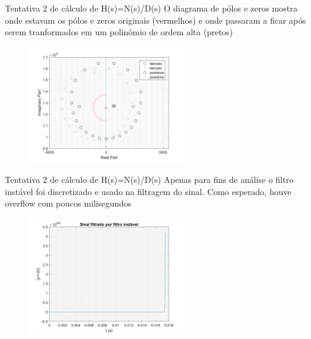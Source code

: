 \begin{frame}{Tentativa 2 de cálculo de H(s)=N(s)/D(s)}
    O diagrama de pólos e zeros mostra onde estavam os pólos e zeros originais (vermelhos) e onde passaram a ficar após serem tranformados em um polinômio de ordem alta (pretos)
    \begin{figure}[!htb]
    \includegraphics[width=0.6\textwidth]{graficos/z_plane_zpk_tf.PNG}
    \end{figure} 
    
\end{frame}

\begin{frame}{Tentativa 2 de cálculo de H(s)=N(s)/D(s)}
    Apenas para fins de análise o filtro instável foi discretizado e usado na filtragem do sinal. Como esperado, houve overflow com poucos milisegundos
        \begin{figure}[!htb]
    \includegraphics[width=0.6\textwidth]{graficos/filtro_instavel_t.PNG}
    \end{figure} 
    
\end{frame}

